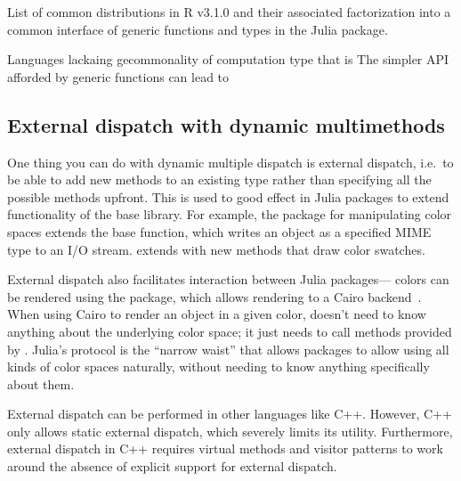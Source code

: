 List of common distributions in R v3.1.0 and their associated factorization into a common interface
of generic functions and  types in the  Julia package.

Languages lackaing gecommonality of computation type that is The simpler API afforded by generic functions can lead to



\subsection{External dispatch with dynamic multimethods}

One thing you can do with dynamic multiple dispatch is external dispatch,
i.e.\ to be able to add new methods to an existing type rather than
specifying all the possible methods upfront. This is used to good effect
in Julia packages to extend functionality of the base library. For example,
the package  for manipulating color spaces extends the
 base function, which writes an object as a specified
MIME type\cite{mimerfc} to an I/O stream.  extends
 with new methods that draw color swatches.


External dispatch also facilitates interaction between Julia packages---
colors can be rendered using the  package,
which allows rendering to a Cairo backend~\cite{cairographics}.
When using Cairo to render an object in a given color, 
doesn't need to know anything about the underlying color space; it just
needs to call  methods provided by .
Julia's  protocol is the ``narrow waist'' that allows
packages to allow using all kinds of color spaces naturally, without
needing to know anything specifically about them.

External dispatch can be performed in other languages like C++. However,
C++ only allows static external dispatch, which severely limits its utility.
Furthermore, external dispatch in C++ requires virtual methods and visitor
patterns\cite{designpatterns} to work around the absence of explicit support
for external dispatch.

